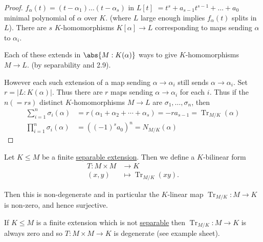 \documentclass{article}
\DeclareMathOperator{\Tr}{Tr}
\begin{document}
\begin{proof}
    $f_\alpha(t) = (t-\alpha_1) \dotsc (t-\alpha_s)$ in $L[t]$
    $ = t^s + a_{s-1} t^{s-1} + \dotsc + a_0$
    minimal polynomial of $\alpha$ over $K$.
    (where $L$ large enough implies $f_\alpha(t)$ splits in $L$).
    There are $s$ $K$-homomorphisms $K[\alpha] \to L$ corresponding to maps sending $\alpha$ to $\alpha_i$.

    Each of these extends in $\abs{M:K(\alpha)}$ ways to give $K$-homomorphisms $M \to L$. (by separability and 2.9).


    However each such extension of a map sending $\alpha \to \alpha_i$ still sends $\alpha \to \alpha_i$.
    Set $r = |L:K(\alpha)|$. Thus there are $r$ maps sending $\alpha \to \alpha_i$ for each $i$.
    Thus if the $n (=rs)$ distinct $K$-homomorphisms $M \to L$ are $\sigma_1, \dotsc, \sigma_n$, then
    \begin{align*}
        \sum_{i=1}^n \sigma_i(\alpha) &= r(\alpha_1 + \alpha_2 + \dotsb + \alpha_s) = -r a_{s-1} = \Tr_{M/K}(\alpha) \\
        \prod_{i=1}^n \sigma_i(\alpha) &= ((-1)^s a_0)^n = N_{M/K}(\alpha)
    \end{align*}
\end{proof}


\begin{nthm}\label{thm:2.21}
    Let $K \leq M$ be a finite \hyperlink{def:separableExt}{separable extension}.
    Then we define a $K$-bilinear form
    \begin{align*}
        T: M \times M &\rightarrow K \\
        (x, y) &\longmapsto \Tr_{M/K} (xy).
    \end{align*}

    Then this is non-degenerate and in particular the $K$-linear map $\Tr_{M/K}:M \to K$ is non-zero, and hence surjective.
\end{nthm}

\begin{remark}
    If $K \leq M$ is a finite extension which is not \hyperlink{def:separableExt}{separable} then $\Tr_{M/K}: M \to K$ is always zero and so $T:M\times M \to K$ is degenerate (see example sheet).
\end{remark}
\end{document}
